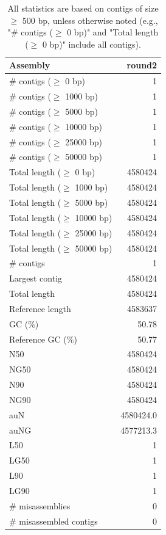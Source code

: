 \documentclass[12pt,a4paper]{article}
\begin{document}
\begin{table}[ht]
\begin{center}
\caption{All statistics are based on contigs of size $\geq$ 500 bp, unless otherwise noted (e.g., "\# contigs ($\geq$ 0 bp)" and "Total length ($\geq$ 0 bp)" include all contigs).}
\begin{tabular}{|l*{1}{|r}|}
\hline
Assembly & round2 \\ \hline
\# contigs ($\geq$ 0 bp) & 1 \\ \hline
\# contigs ($\geq$ 1000 bp) & 1 \\ \hline
\# contigs ($\geq$ 5000 bp) & 1 \\ \hline
\# contigs ($\geq$ 10000 bp) & 1 \\ \hline
\# contigs ($\geq$ 25000 bp) & 1 \\ \hline
\# contigs ($\geq$ 50000 bp) & 1 \\ \hline
Total length ($\geq$ 0 bp) & 4580424 \\ \hline
Total length ($\geq$ 1000 bp) & 4580424 \\ \hline
Total length ($\geq$ 5000 bp) & 4580424 \\ \hline
Total length ($\geq$ 10000 bp) & 4580424 \\ \hline
Total length ($\geq$ 25000 bp) & 4580424 \\ \hline
Total length ($\geq$ 50000 bp) & 4580424 \\ \hline
\# contigs & 1 \\ \hline
Largest contig & 4580424 \\ \hline
Total length & 4580424 \\ \hline
Reference length & 4583637 \\ \hline
GC (\%) & 50.78 \\ \hline
Reference GC (\%) & 50.77 \\ \hline
N50 & 4580424 \\ \hline
NG50 & 4580424 \\ \hline
N90 & 4580424 \\ \hline
NG90 & 4580424 \\ \hline
auN & 4580424.0 \\ \hline
auNG & 4577213.3 \\ \hline
L50 & 1 \\ \hline
LG50 & 1 \\ \hline
L90 & 1 \\ \hline
LG90 & 1 \\ \hline
\# misassemblies & 0 \\ \hline
\# misassembled contigs & 0 \\ \hline

\end{tabular}
\end{center}
\end{table}
\end{document}
